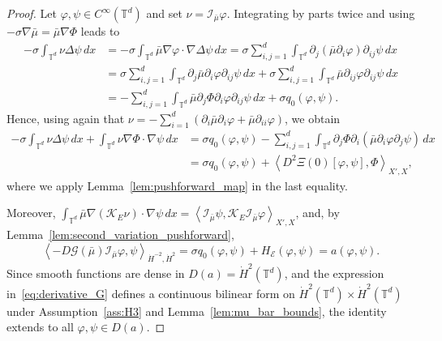 \documentclass[11pt]{article}
\numberwithin{equation}{section}
\theoremstyle{definition}
\newcommand{\T}{\mathbb{T}}
\newcommand{\E}{\mathcal{E}}
\newcommand{\rieszmap}[1][\mu]{\mathcal{I}_{#1}}
\newcommand{\dotHk}[1][k]{\dot{H}^{#1}}
\begin{document}
\begin{proof}
    Let $\varphi, \psi \in C^\infty(\T^d)$ and set $\nu = \rieszmap[\bar\mu]\varphi$.
    Integrating by parts twice and using $-\sigma\nabla \bar\mu = \bar\mu \nabla \Phi$ leads to
    \begin{align*}
        -\sigma \int_{\T^d} \nu \Delta \psi \, dx &= -\sigma \int_{\T^d} \bar\mu \nabla \varphi \cdot \nabla \Delta \psi \, dx = \sigma \sum_{i,j=1}^d \int_{\T^d} \partial_j (\bar\mu \partial_i \varphi) \partial_{ij} \psi \, dx \\
        &= \sigma \sum_{i,j=1}^d \int_{\T^d} \partial_j \bar\mu \partial_i \varphi \partial_{ij} \psi \, dx + \sigma \sum_{i,j=1}^d \int_{\T^d} \bar\mu \partial_{ij} \varphi \partial_{ij} \psi \, dx \\
        &= -\sum_{i,j=1}^d \int_{\T^d} \bar\mu \partial_j \Phi \partial_i \varphi \partial_{ij} \psi \, dx + \sigma q_0(\varphi, \psi).
    \end{align*}
    Hence, using again that $\nu = -\sum_{i=1}^d (\partial_i \bar\mu \partial_i \varphi + \bar\mu \partial_{ii} \varphi)$, we obtain
    \begin{align*}
        -\sigma \int_{\T^d} \nu \Delta \psi \, dx + \int_{\T^d} \nu \nabla \Phi \cdot \nabla \psi \, dx &= \sigma q_0(\varphi, \psi) - \sum_{i,j=1}^d \int_{\T^d} \partial_j \Phi \partial_i (\bar\mu \partial_i \varphi \partial_j \psi) \, dx \\
        &= \sigma q_0(\varphi, \psi) + \left\langle D^2 \Xi(0)[\varphi, \psi], \Phi \right\rangle_{X', X},
    \end{align*}
    where we apply Lemma~\ref{lem:pushforward_map} in the last equality.

    Moreover, $\int_{\T^d} \bar\mu \nabla(\mathcal{K}_E \nu) \cdot \nabla \psi \, dx = \left\langle \rieszmap[\bar\mu]\psi, \mathcal{K}_E \rieszmap[\bar\mu]\varphi \right\rangle_{X', X}$, and, by Lemma~\ref{lem:second_variation_pushforward},
    \begin{equation*}
        \left\langle -D \mathcal{G}(\bar\mu) \rieszmap[\bar\mu]\varphi, \psi \right\rangle_{\dot{H}^{-2}, \dotHk[2]} = \sigma q_0(\varphi, \psi) + H_\E(\varphi, \psi) = a(\varphi, \psi).
    \end{equation*}
    Since smooth functions are dense in $D(a) = \dotHk[2](\T^d)$, and the expression in~\eqref{eq:derivative_G} defines a continuous bilinear form on $\dotHk[2](\T^d) \times \dotHk[2](\T^d)$ under Assumption~\ref{ass:H3} and Lemma~\ref{lem:mu_bar_bounds}, the identity extends to all $\varphi, \psi \in D(a)$.


\end{proof}
\end{document}
